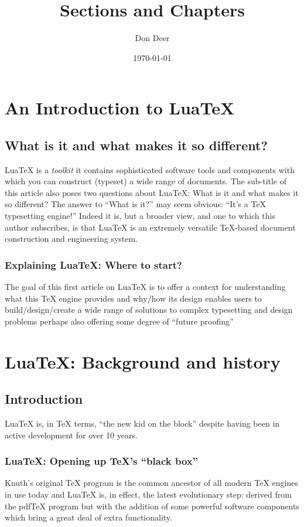 \documentclass{report}
\title{Sections and Chapters}
\author{Don Deer}
\date{\today}
\begin{document}
	\maketitle
	\tableofcontents
	\chapter{An Introduction to Lua\TeX}
	\section{What is it and what makes it so different?}
	Lua\TeX{} is a \textit{toolkit} it contains sophisticated software tools and components with which you can construct (typeset) a wide range of documents. The sub-title of this article also poses two questions about Lua\TeX: What is it and what makes it so different? The answer to “What is it?” may seem obvious: “It’s a \TeX{} typesetting engine!” Indeed it is, but a broader view, and one to which this author subscribes, is that Lua\TeX{} is an extremely versatile \TeX-based document construction and engineering system.
	
	\subsection{Explaining Lua\TeX: Where to start?}
	The goal of this first article on Lua\TeX{} is to offer a context for understanding what this TeX engine provides and why/how its design enables users to build/design/create a wide range of solutions to complex typesetting and design problems perhaps also offering some degree of “future proofing” 
	
	\chapter{Lua\TeX: Background and history}
	\section{Introduction}
	Lua\TeX{} is, in \TeX{} terms, “the new kid on the block” despite having been in active development for over 10 years.
	
	\subsection{Lua\TeX: Opening up \TeX’s “black box”}
	Knuth’s original \TeX{} program is the common ancestor of all modern \TeX{} engines in use today and Lua\TeX{} is, in effect, the latest evolutionary step: derived from the pdf\TeX{} program but with the addition of some powerful software components which bring a great deal of extra functionality.
\end{document}
